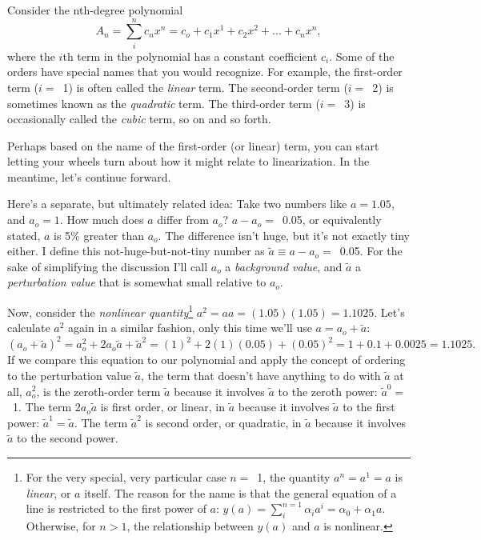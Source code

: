 Consider the nth-degree polynomial
\begin{equation*}
  A_n = \sum\limits_i^n c_n x^n = c_o + c_1 x^1 + c_2 x^2 + \dots + c_n x^n,
\end{equation*}
where the $i$th term in the polynomial has a constant coefficient $c_i$. Some of
the orders have special names that you would recognize. For example, the
first-order term ($i =$~1) is often called the \emph{linear} term. The
second-order term ($i =$~2) is sometimes known as the \emph{quadratic} term. The
third-order term ($i =$~3) is occasionally called the \emph{cubic} term, so on
and so forth.

Perhaps based on the name of the first-order (or linear) term, you can start
letting your wheels turn about how it might relate to linearization. In the
meantime, let's continue forward.

Here's a separate, but ultimately related idea: Take two numbers like
$a = 1.05$, and $a_o = 1$. How much does $a$ differ from $a_o$?
$a - a_o =$~0.05, or equivalently stated, $a$ is 5\% greater than $a_o$. The
difference isn't huge, but it's not exactly tiny either. I define this
not-huge-but-not-tiny number as $ \tilde a \equiv a - a_o =$~0.05. For the sake
of simplifying the discussion I'll call $a_o$ a \emph{background value}, and
$\tilde a$ a \emph{perturbation value} that is somewhat small relative to $a_o$.

Now, consider the \emph{nonlinear quantity}\footnote{For the very special, very
  particular case $n =$~1, the quantity $a^n = a^1 = a$ is \emph{linear}, or $a$
  itself. The reason for the name is that the general equation of a line is
  restricted to the first power of $a$:
  $y(a) = \sum_i^{n=1} \alpha_i a^i = \alpha_0 + \alpha_1 a$. Otherwise, for
  $n > 1$, the relationship between $y(a)$ and $a$ is nonlinear.  }
$a^2 = a a = (1.05)(1.05) = 1.1025$. Let's calculate $a^2$ again in a similar
fashion, only this time we'll use $a = a_o + \tilde a$:
\begin{equation*}
  (a_o + \tilde a)^2 = a_o^2 + 2 a_o \tilde a + {\tilde a}^2 = (1)^2 + 2(1)(0.05) + (0.05)^2 = 1 + 0.1 + 0.0025 = 1.1025.
\end{equation*}
If we compare this equation to our polynomial and apply the concept of ordering
to the perturbation value $\tilde a$, the term that doesn't have anything to do
with $\tilde a$ at all, $a_o^2$, is the zeroth-order term $\tilde a$ because it
involves $\tilde a$ to the zeroth power: $\tilde a^0 =$~1. The term
$2 a_o \tilde a$ is first order, or linear, in $\tilde a$ because it involves
$\tilde a$ to the first power: $\tilde a^1 =\tilde a$. The term $\tilde a^2$ is
second order, or quadratic, in $\tilde a$ because it involves $\tilde a$ to
the second power.  

